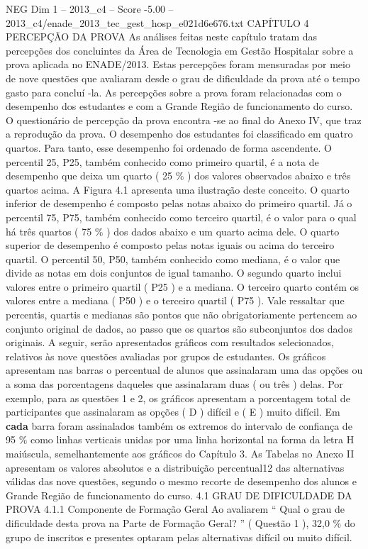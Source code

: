 \begin{textsample}{NEG Dim 1 – 2013\_c4 – Score -5.00 – 2013\_c4/enade\_2013\_tec\_gest\_hosp\_e021d6e676.txt}  \label{ex:f1_neg_054}
CAPÍTULO 4 PERCEPÇÃO DA PROVA As análises feitas neste capítulo tratam das percepções dos concluintes da Área de Tecnologia em Gestão Hospitalar sobre a prova aplicada no ENADE/2013.
Estas percepções foram mensuradas por meio de nove questões que avaliaram desde o grau de dificuldade da prova até o tempo gasto para concluí -la.
As percepções sobre a prova foram relacionadas com o desempenho dos estudantes e com a Grande Região de funcionamento do curso.
O questionário de percepção da prova encontra -se ao final do Anexo IV, que traz a reprodução da prova.
O desempenho dos estudantes foi classificado em quatro quartos.
Para tanto, esse desempenho foi ordenado de forma ascendente.
O percentil 25, P25, também conhecido como primeiro quartil, é a nota de desempenho que deixa um quarto ( 25 \% ) dos valores observados abaixo e três quartos acima.
A Figura 4.1 apresenta uma ilustração deste conceito.
O quarto inferior de desempenho é composto pelas notas abaixo do primeiro quartil.
Já o percentil 75, P75, também conhecido como terceiro quartil, é o valor para o qual há três quartos ( 75 \% ) dos dados abaixo e um quarto acima dele.
O quarto superior de desempenho é composto pelas notas iguais ou acima do terceiro quartil.
O percentil 50, P50, também conhecido como mediana, é o valor que divide as notas em dois conjuntos de igual tamanho.
O segundo quarto inclui valores entre o primeiro quartil ( P25 ) e a mediana.
O terceiro quarto contém os valores entre a mediana ( P50 ) e o terceiro quartil ( P75 ).
Vale ressaltar que percentis, quartis e medianas são pontos que não obrigatoriamente pertencem ao conjunto original de dados, ao passo que os quartos são subconjuntos dos dados originais.
A seguir, serão apresentados gráficos com resultados selecionados, relativos às nove questões avaliadas por grupos de estudantes.
Os gráficos apresentam nas barras o percentual de alunos que assinalaram uma das opções ou a soma das porcentagens daqueles que assinalaram duas ( ou três ) delas.
Por exemplo, para as questões 1 e 2, os gráficos apresentam a porcentagem total de participantes que assinalaram as opções ( D ) difícil e ( E ) muito difícil.
Em \textbf{cada} barra foram assinalados também os extremos do intervalo de confiança de 95 \% como linhas verticais unidas por uma linha horizontal na forma da letra H maiúscula, semelhantemente aos gráficos do Capítulo 3.
As Tabelas no Anexo II apresentam os valores absolutos e a distribuição percentual12 das alternativas válidas das nove questões, segundo o mesmo recorte de desempenho dos alunos e Grande Região de funcionamento do curso. 4.1 GRAU DE DIFICULDADE DA PROVA 4.1.1 Componente de Formação Geral Ao avaliarem “ Qual o grau de dificuldade desta prova na Parte de Formação Geral? ” ( Questão 1 ), 32,0 \% do grupo de inscritos e presentes optaram pelas alternativas difícil ou muito difícil.

\end{textsample}
